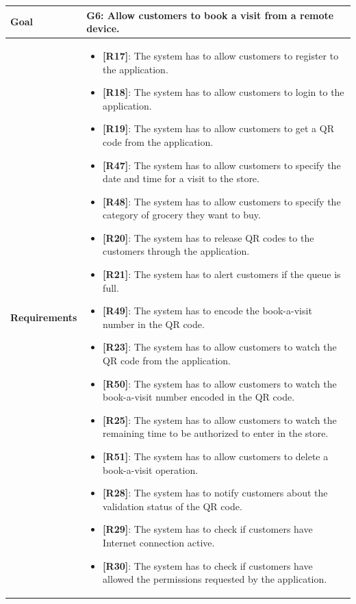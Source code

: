 \begin{table}[H]
\centering
\begin{tabular}{| m{} | m{} |} 
	\hline
	\textbf{Goal} &
		\textbf{G6: Allow customers to book a visit from a remote device.} \\
	\hline
	\textbf{Requirements} &
		\begin{itemize}
			\item {\textbf{[R17]}}: The system has to allow customers to register to the application.
			\item {\textbf{[R18]}}: The system has to allow customers to login to the application.
			\item {\textbf{[R19]}}: The system has to allow customers to get a QR code from the application.
			\item {\textbf{[R47]}}: The system has to allow customers to specify the date and time for a visit to the store.
			\item {\textbf{[R48]}}: The system has to allow customers to specify the category of grocery they want to buy.
			\item {\textbf{[R20]}}: The system has to release QR codes to the customers through the application.
			\item {\textbf{[R21]}}: The system has to alert customers if the queue is full.
			\item {\textbf{[R49]}}: The system has to encode the book-a-visit number in the QR code.
			\item {\textbf{[R23]}}: The system has to allow customers to watch the QR code from the application.
			\item {\textbf{[R50]}}: The system has to allow customers to watch the book-a-visit number encoded in the QR code.
			\item {\textbf{[R25]}}: The system has to allow customers to watch the remaining time to be authorized to enter in the store.
			\item {\textbf{[R51]}}: The system has to allow customers to delete a book-a-visit operation.
			\item {\textbf{[R28]}}: The system has to notify customers about the validation status of the QR code.
			\item {\textbf{[R29]}}: The system has to check if customers have Internet connection active.
			\item {\textbf{[R30]}}: The system has to check if customers have allowed the permissions requested by the application.

\end{itemize}
\end{tabular}
\end{table}
